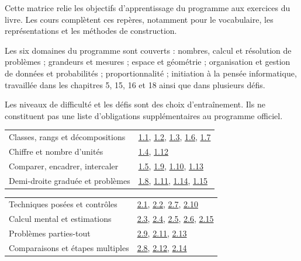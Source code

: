 \clearpage{}\label{couverture-programme}\gdef\otChapNum{0}\pagestyle{otFront}
Cette matrice relie les objectifs d’apprentissage du programme aux
exercices du livre. Les cours complètent ces repères, notamment pour
le vocabulaire, les représentations et les méthodes de construction.\par\bigskip
Les six domaines du programme sont couverts : nombres, calcul et
résolution de problèmes ; grandeurs et mesures ; espace et géométrie ;
organisation et gestion de données et probabilités ; proportionnalité ;
initiation à la pensée informatique, travaillée dans les chapitres 5,
15, 16 et 18 ainsi que dans plusieurs défis.\par\bigskip
\begin{attention}Les niveaux de difficulté et les défis sont des choix
d’entraînement. Ils ne constituent pas une liste d’obligations
supplémentaires au programme officiel.\end{attention}\clearpage
{}\fontsize{10}{13}\selectfont
{}\begin{tabularx}{\linewidth}{@{}Yl@{}}\toprule
Classes, rangs et décompositions & \hyperref[exo-1-1]{1.1}, \hyperref[exo-1-2]{1.2}, \hyperref[exo-1-3]{1.3}, \hyperref[exo-1-6]{1.6}, \hyperref[exo-1-7]{1.7}\\[2mm]
Chiffre et nombre d’unités & \hyperref[exo-1-4]{1.4}, \hyperref[exo-1-12]{1.12}\\[2mm]
Comparer, encadrer, intercaler & \hyperref[exo-1-5]{1.5}, \hyperref[exo-1-9]{1.9}, \hyperref[exo-1-10]{1.10}, \hyperref[exo-1-13]{1.13}\\[2mm]
Demi-droite graduée et problèmes & \hyperref[exo-1-8]{1.8}, \hyperref[exo-1-11]{1.11}, \hyperref[exo-1-14]{1.14}, \hyperref[exo-1-15]{1.15}\\[2mm]
\bottomrule\end{tabularx}\par\vspace{4mm}
\begin{tabularx}{\linewidth}{@{}Yl@{}}\toprule
Techniques posées et contrôles & \hyperref[exo-2-1]{2.1}, \hyperref[exo-2-2]{2.2}, \hyperref[exo-2-7]{2.7}, \hyperref[exo-2-10]{2.10}\\[2mm]
Calcul mental et estimations & \hyperref[exo-2-3]{2.3}, \hyperref[exo-2-4]{2.4}, \hyperref[exo-2-5]{2.5}, \hyperref[exo-2-6]{2.6}, \hyperref[exo-2-15]{2.15}\\[2mm]
Problèmes parties-tout & \hyperref[exo-2-9]{2.9}, \hyperref[exo-2-11]{2.11}, \hyperref[exo-2-13]{2.13}\\[2mm]
Comparaisons et étapes multiples & \hyperref[exo-2-8]{2.8}, \hyperref[exo-2-12]{2.12}, \hyperref[exo-2-14]{2.14}\\[2mm]
\bottomrule\end{tabularx}\par\vspace{4mm}
